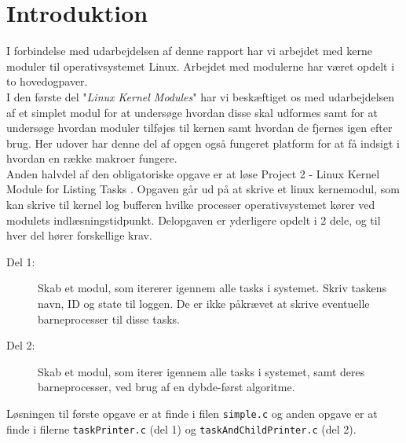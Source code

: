 \documentclass[main.tex]{subfile}
\begin{document}
\section{Introduktion}
I forbindelse med udarbejdelsen af denne rapport har vi arbejdet med kerne moduler til operativsystemet Linux. Arbejdet med modulerne har været opdelt i to hovedogpaver.\\ 

I den første del "\emph{Linux Kernel Modules}" \cite[s.94]{SA:2013} har vi beskæftiget os med udarbejdelsen af et simplet modul for at undersøge hvordan disse skal udformes samt for at undersøge hvordan moduler tilføjes til kernen samt hvordan de fjernes igen efter brug. Her udover har denne del af opgen også fungeret platform for at få indsigt i hvordan en række makroer fungere.\\

Anden halvdel af den obligatoriske opgave er at løse Project 2 - Linux Kernel Module for Listing Tasks \cite[s.156-158]{SA:2013}. Opgaven går ud på at skrive et linux kernemodul, som kan skrive til kernel log bufferen hvilke processer operativsystemet kører ved modulets indlæsningstidpunkt. Delopgaven er yderligere opdelt i 2 dele, og til hver del hører forskellige krav.

\begin{description}
\item[Del 1:] Skab et modul, som itererer igennem alle tasks i systemet. Skriv taskens navn, ID og state til loggen. De er ikke påkrævet at skrive eventuelle barneprocesser til disse tasks.
\item[Del 2:] Skab et modul, som iterer igennem alle tasks i systemet, samt deres barneprocesser, ved brug af en dybde-først algoritme.
\end{description}

Løsningen til første opgave er at finde i filen \texttt{simple.c} og anden opgave er at finde i filerne \texttt{taskPrinter.c} (del 1) og \texttt{taskAndChildPrinter.c} (del 2).
\end{document}

